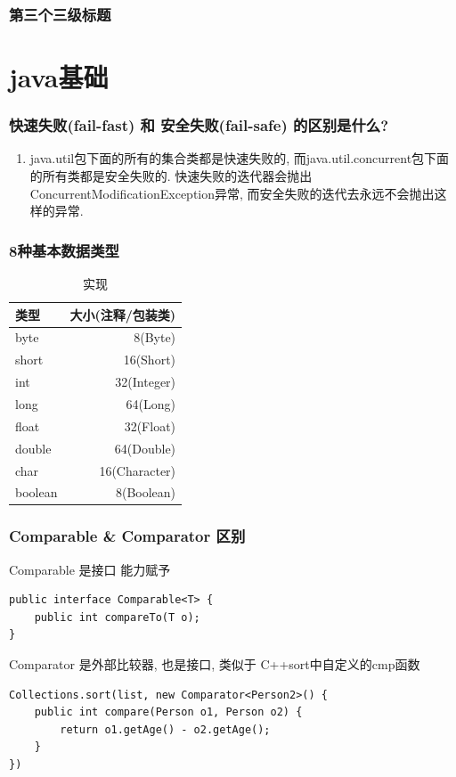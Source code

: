 \documentclass[UTF8]{ctexart}
\begin{document}
	\subsubsection{第三个三级标题}
	
	
	\section{java基础}
	\subsubsection{快速失败(fail-fast) 和 安全失败(fail-safe) 的区别是什么?}
	\begin{enumerate}
		\item java.util包下面的所有的集合类都是快速失败的, 而java.util.concurrent包下面的所有类都是安全失败的. 快速失败的迭代器会抛出ConcurrentModificationException异常, 而安全失败的迭代去永远不会抛出这样的异常.

	\end{enumerate}
\subsubsection{8种基本数据类型}
\begin{table}[!htbp]
	\centering
	\caption{实现}
	\begin{tabular}{|l|r|}
		
		\hline
		类型&大小(注释/包装类)\\
		\hline
		byte&8(Byte)\\
		\hline
		short&16(Short)\\
		\hline
		int&32(Integer)\\
		\hline
		long&64(Long)\\
		\hline
		float&32(Float)\\
		\hline
		double&64(Double)\\
		\hline
		char&16(Character)\\
		\hline
		boolean&8(Boolean)\\
		\hline
	\end{tabular}
\end{table}
\subsubsection{Comparable \& Comparator 区别}
Comparable 是接口 能力赋予
\begin{lstlisting}
public interface Comparable<T> {
	public int compareTo(T o);
}
\end{lstlisting}
Comparator 是外部比较器, 也是接口, 类似于 C++sort中自定义的cmp函数
\begin{lstlisting}
Collections.sort(list, new Comparator<Person2>() {
	public int compare(Person o1, Person o2) {
		return o1.getAge() - o2.getAge();
	}
})
\end{lstlisting}
\end{document}
